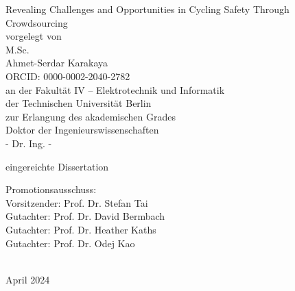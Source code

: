 
\thispagestyle{empty}
\begin{center}
    \huge{Revealing Challenges and Opportunities in Cycling Safety Through Crowdsourcing}\\[2pc]
    
    \large{vorgelegt von}\\
    \large{M.Sc.}\\
    \large{Ahmet-Serdar Karakaya}\\
    \large{ORCID: 0000-0002-2040-2782}\\[2pc]


    an der Fakultät IV – Elektrotechnik und Informatik\\
    der Technischen Universität Berlin\\
    zur Erlangung des akademischen Grades\\
    Doktor der Ingenieurswissenschaften\\
    - Dr. Ing. -
\end{center}

\begin{center}
eingereichte Dissertation
\end{center}

Promotionsausschuss:\\
Vorsitzender: Prof. Dr. Stefan Tai\\
Gutachter: Prof. Dr. David Bermbach\\
Gutachter: Prof. Dr. Heather Kaths\\
Gutachter: Prof. Dr. Odej Kao\\
\\
\begin{center}
April 2024
\end{center}

\afterpage{\null\thispagestyle{empty}\newpage}
